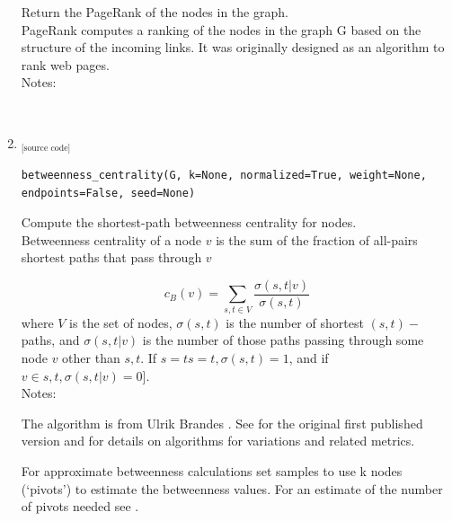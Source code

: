 \documentclass{article}
\begin{document}
\begin{enumerate}
Return the PageRank of the nodes in the graph. \\

PageRank computes a ranking of the nodes in the graph G based on the structure of the incoming links. It was originally designed as an algorithm to rank web pages.\\

Notes: \\
\par {} \cite{pr_algo1} \cite{pr_algo2}\\

\item  \href{https://networkx.github.io/documentation/networkx-1.11/reference/generated/networkx.algorithms.centrality.betweenness_centrality.html?highlight=betweenness_centrality}{} \href{https://networkx.github.io/documentation/networkx-1.11/_modules/networkx/algorithms/centrality/betweenness.html#betweenness_centrality}{$_{\text{[source code]}}$}
\begin{lstlisting}
betweenness_centrality(G, k=None, normalized=True, weight=None, endpoints=False, seed=None)
\end{lstlisting}

Compute the shortest-path betweenness centrality for nodes.\\

Betweenness centrality of a node $v$ is the sum of the fraction of all-pairs shortest paths that pass through $v$

$$c_B(v)=\sum_{s,t \in V} \frac{\sigma (s,t|v)}{\sigma (s,t)}$$
where $V$ is the set of nodes, $\sigma (s,t)$ is the number of shortest $(s,t)-$paths, and $\sigma (s,t|v)$ is the number of those paths passing through some node $v$ other than $s,t$. If $s=ts=t, \sigma (s,t)=1$, and if $v\in s,t, \sigma (s,t|v)=0$].\\

Notes: \\
\par The algorithm is from Ulrik Brandes \cite{bc_algo1}. See \cite{bc_algo4} for the original first published version and \cite{bc_algo2} for details on algorithms for variations and related metrics.\\

\par For approximate betweenness calculations set samples to use k nodes (`pivots') to estimate the betweenness values. For an estimate of the number of pivots needed see \cite{bc_algo3}.\\


\end{enumerate}
\end{document}
